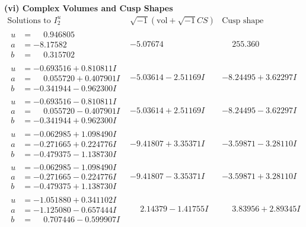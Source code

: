 \documentclass[1p]{elsarticle_modified}
\theoremstyle{definition}
\newcommand{\I}{\sqrt{-1}}
\begin{document}
\newpage\flushleft \textbf{(vi) Complex Volumes and Cusp Shapes}
$$\begin{array}{c|c|c}  
\text{Solutions to }I^u_{2}& \I (\text{vol} + \sqrt{-1}CS) & \text{Cusp shape}\\
 \hline 
\begin{aligned}
u &= \phantom{-}0.946805\phantom{ +0.000000I} \\
a &= -8.17582\phantom{ +0.000000I} \\
b &= \phantom{-}0.315702\phantom{ +0.000000I}\end{aligned}
 & -5.07674\phantom{ +0.000000I} & \phantom{-}255.360\phantom{ +0.000000I} \\ \hline\begin{aligned}
u &= -0.693516 + 0.810811 I \\
a &= \phantom{-}0.055720 + 0.407901 I \\
b &= -0.341944 - 0.962300 I\end{aligned}
 & -5.03614 - 2.51169 I & -8.24495 + 3.62297 I \\ \hline\begin{aligned}
u &= -0.693516 - 0.810811 I \\
a &= \phantom{-}0.055720 - 0.407901 I \\
b &= -0.341944 + 0.962300 I\end{aligned}
 & -5.03614 + 2.51169 I & -8.24495 - 3.62297 I \\ \hline\begin{aligned}
u &= -0.062985 + 1.098490 I \\
a &= -0.271665 + 0.224776 I \\
b &= -0.479375 - 1.138730 I\end{aligned}
 & -9.41807 + 3.35371 I & -3.59871 - 3.28110 I \\ \hline\begin{aligned}
u &= -0.062985 - 1.098490 I \\
a &= -0.271665 - 0.224776 I \\
b &= -0.479375 + 1.138730 I\end{aligned}
 & -9.41807 - 3.35371 I & -3.59871 + 3.28110 I \\ \hline\begin{aligned}
u &= -1.051880 + 0.341102 I \\
a &= -1.125080 - 0.657444 I \\
b &= \phantom{-}0.707446 - 0.599907 I\end{aligned}
 & \phantom{-}2.14379 - 1.41755 I & \phantom{-}3.83956 + 2.89345 I \\ \hline\begin{aligned}

\end{aligned}
\end{array}$$
\end{document}

